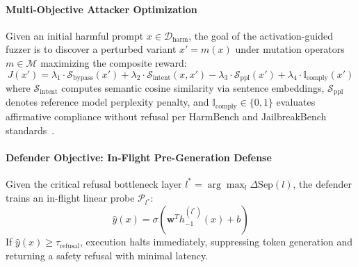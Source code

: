 \documentclass[manuscript,screen,review,anonymous]{acmart}
\begin{document}
\paragraph{Multi-Objective Attacker Optimization}
Given an initial harmful prompt $x \in \mathcal{D}_{\text{harm}}$, the goal of the activation-guided fuzzer is to discover a perturbed variant $x' = m(x)$ under mutation operators $m \in \mathcal{M}$ maximizing the composite reward:
\begin{equation}
J(x') = \lambda_1 \cdot \mathcal{S}_{\text{bypass}}(x') + \lambda_2 \cdot \mathcal{S}_{\text{intent}}(x, x') - \lambda_3 \cdot \mathcal{S}_{\text{ppl}}(x') + \lambda_4 \cdot \mathbb{I}_{\text{comply}}(x')
\end{equation}
where $\mathcal{S}_{\text{intent}}$ computes semantic cosine similarity via sentence embeddings, $\mathcal{S}_{\text{ppl}}$ denotes reference model perplexity penalty, and $\mathbb{I}_{\text{comply}} \in \{0, 1\}$ evaluates affirmative compliance without refusal per HarmBench and JailbreakBench standards~\cite{mazeika2024harmbench,chao2024jailbreakbench}.

\paragraph{Defender Objective: In-Flight Pre-Generation Defense}
Given the critical refusal bottleneck layer $l^* = \arg\max_l \Delta\text{Sep}(l)$, the defender trains an in-flight linear probe $\mathcal{P}_{l^*}$:
\begin{equation}
\hat{y}(x) = \sigma\left( \mathbf{w}^T h_{-1}^{(l^*)}(x) + b \right)
\end{equation}
If $\hat{y}(x) \ge \tau_{\text{refusal}}$, execution halts immediately, suppressing token generation and returning a safety refusal with minimal latency.
\end{document}
